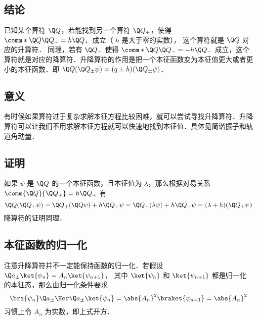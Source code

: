 

\subsection{结论}

已知某个算符 $\Q Q$，若能找到另一个算符 $\Q Q_+$，使得 $\comm*{\Q Q}{\Q Q_+} = h \Q Q_+$ 成立（ $h$ 是大于零的实数）， 这个算符就是 $\Q Q$ 对应的升算符． 同理，若有 $\Q Q_-$ 使得 $\comm*{\Q Q}{\Q Q_-} = - h\Q Q_-$ 成立，这个算符就是对应的降算符．升降算符的作用是把一个本征函数变为本征值更大或者更小的本征函数．即 $\Q Q(\Q Q_\pm\psi) = (q \pm h) (\Q Q_ \pm\psi)$．

\subsection{意义}
有时候如果算符过于复杂求解本征方程比较困难，就可以尝试寻找升降算符．升降算符可以让我们不用求解本征方程就可以快速地找到本征值．具体见简谐振子和轨道角动量．%

\subsection{证明}
如果 $\psi$ 是 $\Q Q$ 的一个本征函数，且本征值为 $\lambda$，那么根据对易关系 $\comm{\Q Q}{\Q Q_+} = h \Q Q_+$ 有
\begin{equation}
\Q Q (\Q Q_+ \psi) = \Q Q_+ (\Q Q\psi) + h \Q Q_+ \psi  = \Q Q_+ (\lambda \psi) + h \Q Q_+ \psi  = (\lambda  + h)(\Q Q_+ \psi)
\end{equation}
降算符的证明同理．

\subsection{本征函数的归一化}
注意升降算符并不一定能保持函数的归一化．若假设 $\Q a_\pm \ket{\psi_n} = A_n \ket{\psi_{n+1}}$， 其中 $\ket{\psi_n}$ 和 $\ket{\psi_{n + 1}}$ 都是归一化的本征态，那么由归一化条件要求
\begin{equation}
\bra{\psi_n} \Q a_\pm\Her \Q a_\pm \ket{\psi_n} = \abs{A_n}^2 \braket{\psi_{n+1}} = \abs{A_n}^2
\end{equation}
习惯上令 $A_n$ 为实数，即上式开方． 

